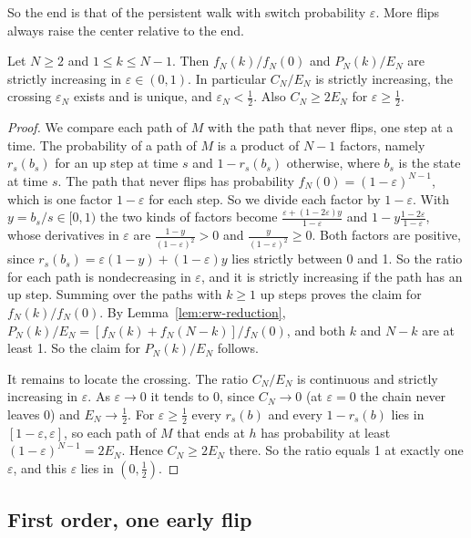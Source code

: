 So the end is that of the persistent walk with switch probability
$\varepsilon$. More flips always raise the center relative to the end.

\begin{proposition}\label{prop:mlr}
Let $N\ge2$ and $1\le k\le N-1$. Then $f_N(k)/f_N(0)$ and $P_N(k)/E_N$ are
strictly increasing in $\varepsilon\in(0,1)$. In particular $C_N/E_N$ is
strictly increasing, the crossing $\varepsilon_N$ exists and is unique, and
$\varepsilon_N<\frac12$. Also $C_N\ge2E_N$ for $\varepsilon\ge\frac12$.
\end{proposition}

\begin{proof}
We compare each path of $M$ with the path that never flips, one step at a
time. The probability of a path of $M$ is a product of $N-1$ factors, namely
$r_s(b_s)$ for an up step at time $s$ and $1-r_s(b_s)$ otherwise, where $b_s$
is the state at time $s$. The path that never flips has probability
$f_N(0)=(1-\varepsilon)^{N-1}$, which is one factor $1-\varepsilon$ for each
step. So we divide each factor by $1-\varepsilon$. With $y=b_s/s\in[0,1)$ the
two kinds of factors become
$\frac{\varepsilon+(1-2\varepsilon)y}{1-\varepsilon}$ and
$1-y\frac{1-2\varepsilon}{1-\varepsilon}$, whose derivatives in
$\varepsilon$ are $\frac{1-y}{(1-\varepsilon)^2}>0$ and
$\frac y{(1-\varepsilon)^2}\ge0$. Both factors are positive, since
$r_s(b_s)=\varepsilon(1-y)+(1-\varepsilon)y$ lies strictly between 0 and 1.
So the ratio for each path is nondecreasing in $\varepsilon$, and it is
strictly increasing if the path has an up step. Summing over the paths with
$k\ge1$ up steps proves the claim for $f_N(k)/f_N(0)$. By
Lemma~\ref{lem:erw-reduction},
$P_N(k)/E_N=[f_N(k)+f_N(N-k)]/f_N(0)$, and both $k$ and $N-k$ are at least 1.
So the claim for $P_N(k)/E_N$ follows.

It remains to locate the crossing. The ratio $C_N/E_N$ is continuous and
strictly increasing in $\varepsilon$. As $\varepsilon\to0$ it tends to 0,
since $C_N\to0$ (at $\varepsilon=0$ the chain never leaves 0) and
$E_N\to\frac12$. For $\varepsilon\ge\frac12$ every $r_s(b)$ and every
$1-r_s(b)$ lies in $[1-\varepsilon,\varepsilon]$, so each path of $M$ that
ends at $h$ has probability at least $(1-\varepsilon)^{N-1}=2E_N$. Hence
$C_N\ge2E_N$ there. So the ratio equals 1 at exactly one $\varepsilon$, and
this $\varepsilon$ lies in $(0,\frac12)$.
\end{proof}

\subsection{First order, one early flip}

